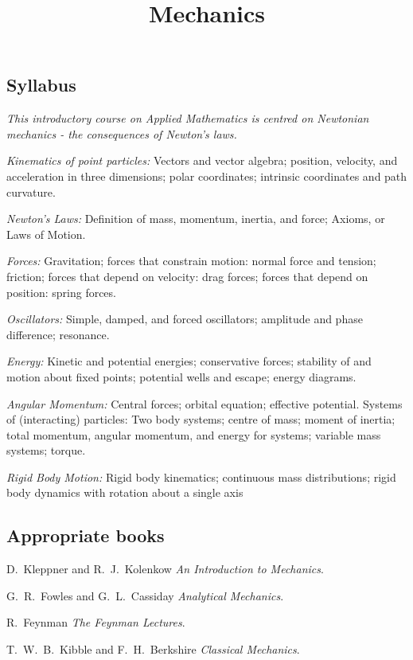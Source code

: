 \documentclass[10pt]{scrartcl}
\title{Mechanics}
\begin{document}
{
\subsection*{Syllabus} 

\textit{This introductory course on Applied Mathematics is centred on Newtonian mechanics - the consequences of Newton’s laws.}

\emph{Kinematics of point particles:} Vectors and vector algebra; position, velocity, and acceleration in three dimensions; polar coordinates; intrinsic coordinates and path curvature.

\emph{Newton's Laws:} Definition of mass, momentum, inertia, and force; Axioms, or Laws of Motion. 

\emph{Forces:} Gravitation; forces that constrain motion: normal force and tension; friction; forces that depend on velocity: drag forces; forces that depend on position: spring forces. 

\emph{Oscillators:} Simple, damped, and forced oscillators; amplitude and phase difference; resonance.

\emph{Energy:} Kinetic and potential energies; conservative forces; stability of and motion about fixed points; potential wells and escape; energy diagrams.

\emph{Angular Momentum:} Central forces; orbital equation; effective potential. Systems of (interacting) particles: Two body systems; centre of mass; moment of inertia; total momentum, angular momentum, and energy for systems; variable mass systems; torque. 

\emph{Rigid Body Motion:} Rigid body kinematics; continuous mass distributions; rigid body dynamics with rotation about a single axis

\subsection*{Appropriate books}

{\shortskip
D.~Kleppner and R.~J.~Kolenkow \emph{An Introduction to Mechanics}.

G.~R.~Fowles and G.~L.~Cassiday \emph{Analytical Mechanics}.

R.~Feynman \emph{The Feynman Lectures}.

T.~W.~B.~Kibble and F.~H.~Berkshire \emph{Classical Mechanics}.

}
}

\TableofContents
\end{document}
